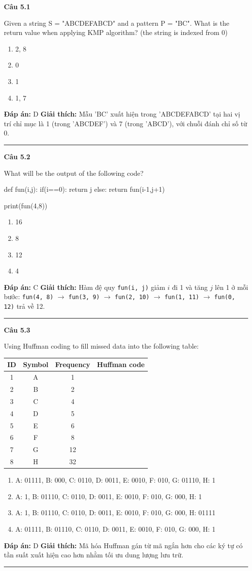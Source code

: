 \documentclass[11pt,a4paper]{article}
\newenvironment{question}[1]{%
  \par\vspace{1em}\noindent\textbf{\large Câu #1}\par\vspace{0.4em}
}{%
  \par\vspace{1em}\hrule\vspace{0.6em}
}
\newenvironment{choices}{%
  \begin{enumerate}[label=\textbf{\Alph*.},leftmargin=2.2em,itemsep=2pt,topsep=3pt]
}{%
  \end{enumerate}
}
\newcommand{\choice}{\item}
\newenvironment{codebox}{%
  \begin{tcolorbox}[colback=gray!8!white,colframe=gray!50!black,arc=1.5mm,boxrule=0.6pt,left=3mm,right=3mm,top=2.5mm,bottom=2.5mm]
  \ttfamily\small
}{%
  \end{tcolorbox}
}
\begin{document}
\begin{question}{5.1}
Given a string S = "ABCDEFABCD" and a pattern P = "BC". What is the return value when applying KMP algorithm? (the string is indexed from 0)
\begin{choices}
\choice 2, 8
\choice 0
\choice 1
\choice 1, 7
\end{choices}
\textbf{Đáp án:} D
\textbf{Giải thích:} Mẫu 'BC' xuất hiện trong 'ABCDEFABCD' tại hai vị trí chỉ mục là 1 (trong 'ABCDEF') và 7 (trong 'ABCD'), với chuỗi đánh chỉ số từ 0.
\end{question}

\begin{question}{5.2}
What will be the output of the following code?
\begin{codebox}
def fun(i,j):
  if(i==0):
    return j
  else:
    return fun(i-1,j+1)

print(fun(4,8))
\end{codebox}
\begin{choices}
\choice 16
\choice 8
\choice 12
\choice 4
\end{choices}
\textbf{Đáp án:} C
\textbf{Giải thích:} Hàm đệ quy \texttt{fun(i, j)} giảm $i$ đi 1 và tăng $j$ lên 1 ở mỗi bước: \texttt{fun(4, 8)} $\to$ \texttt{fun(3, 9)} $\to$ \texttt{fun(2, 10)} $\to$ \texttt{fun(1, 11)} $\to$ \texttt{fun(0, 12)} trả về 12.
\end{question}

\begin{question}{5.3}
Using Huffman coding to fill missed data into the following table:
\begin{center}
\begin{tabular}{|c|c|c|c|}
\hline
\textbf{ID} & \textbf{Symbol} & \textbf{Frequency} & \textbf{Huffman code} \\
\hline
1 & A & 1 & \\
\hline
2 & B & 2 & \\
\hline
3 & C & 4 & \\
\hline
4 & D & 5 & \\
\hline
5 & E & 6 & \\
\hline
6 & F & 8 & \\
\hline
7 & G & 12 & \\
\hline
8 & H & 32 & \\
\hline
\end{tabular}
\end{center}
\begin{choices}
\choice A: 01111, B: 000, C: 0110, D: 0011, E: 0010, F: 010, G: 01110, H: 1
\choice A: 1, B: 01110, C: 0110, D: 0011, E: 0010, F: 010, G: 000, H: 1
\choice A: 1, B: 01110, C: 0110, D: 0011, E: 0010, F: 010, G: 000, H: 01111
\choice A: 01111, B: 01110, C: 0110, D: 0011, E: 0010, F: 010, G: 000, H: 1
\end{choices}
\textbf{Đáp án:} D
\textbf{Giải thích:} Mã hóa Huffman gán từ mã ngắn hơn cho các ký tự có tần suất xuất hiện cao hơn nhằm tối ưu dung lượng lưu trữ.
\end{question}
\end{document}
